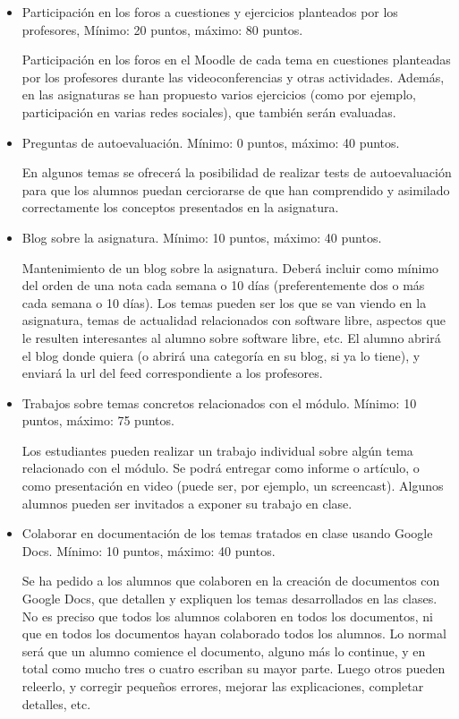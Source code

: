 \documentclass[a4paper,12pt]{article}
\begin{document}
\begin{itemize}
\item Participación en los foros a cuestiones y ejercicios planteados por los profesores,  Mínimo: 20 puntos, máximo: 80 puntos.

Participación en los foros en el Moodle de cada tema en cuestiones planteadas por los profesores durante las videoconferencias y otras actividades. Además, en las asignaturas se han propuesto varios ejercicios (como por ejemplo, participación en varias redes sociales), que también serán evaluadas.

\item Preguntas de autoevaluación. Mínimo: 0 puntos, máximo: 40 puntos.

En algunos temas se ofrecerá la posibilidad de realizar tests de autoevaluación para que los alumnos puedan cerciorarse de que han comprendido y asimilado correctamente los conceptos presentados en la asignatura.

\item Blog sobre la asignatura. Mínimo: 10 puntos, máximo: 40 puntos.

Mantenimiento de un blog sobre la asignatura. Deberá incluir como mínimo del orden de una nota cada semana o 10 días (preferentemente dos o más cada semana o 10 días). Los temas pueden ser los que se van viendo en la asignatura, temas de actualidad relacionados con software libre, aspectos que le resulten interesantes al alumno sobre software libre, etc. El alumno abrirá el blog donde quiera (o abrirá una categoría en su blog, si ya lo tiene), y enviará la url del feed correspondiente a los profesores.


\item Trabajos sobre temas concretos relacionados con el módulo. Mínimo: 10 puntos, máximo: 75 puntos.

Los estudiantes pueden realizar un trabajo individual sobre algún tema relacionado con el módulo. Se podrá entregar como informe o artículo, o como presentación en video (puede ser, por ejemplo, un screencast). Algunos alumnos pueden ser invitados a exponer su trabajo en clase.


\item Colaborar en documentación de los temas tratados en clase usando Google Docs. Mínimo: 10 puntos, máximo: 40 puntos.

Se ha pedido a los alumnos que colaboren en la creación de documentos con Google Docs, que detallen y expliquen los temas desarrollados en las clases. No es preciso que todos los alumnos colaboren en todos los documentos, ni que en todos los documentos hayan colaborado todos los alumnos. Lo normal será que un alumno comience el documento, alguno más lo continue, y en total como mucho tres o cuatro escriban su mayor parte. Luego otros pueden releerlo, y corregir pequeños errores, mejorar las explicaciones, completar detalles, etc.


\end{itemize}
\end{document}
